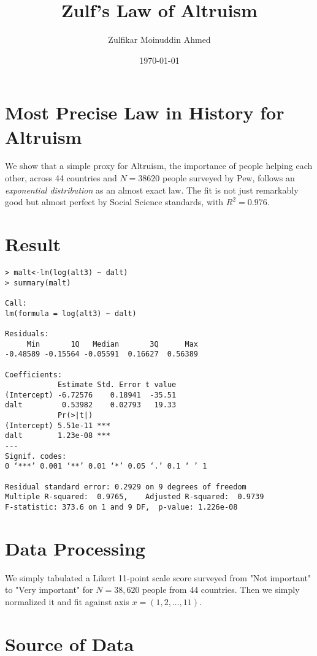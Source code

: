 \documentclass{amsart}
\title{Zulf's Law of Altruism}
\author{Zulfikar Moinuddin Ahmed}
\date{\today}
\begin{document}
\maketitle

\section{Most Precise Law in History for Altruism}

We show that a simple proxy for Altruism, the importance of people helping each other, across 44 countries and $N=38620$ people surveyed by Pew, follows an {\em exponential distribution} as an almost exact law.  The fit is not just remarkably good but almost perfect by Social Science standards, with $R^2 = 0.976$.

\section{Result}

\begin{verbatim}
> malt<-lm(log(alt3) ~ dalt)
> summary(malt)

Call:
lm(formula = log(alt3) ~ dalt)

Residuals:
     Min       1Q   Median       3Q      Max 
-0.48589 -0.15564 -0.05591  0.16627  0.56389 

Coefficients:
            Estimate Std. Error t value
(Intercept) -6.72576    0.18941  -35.51
dalt         0.53982    0.02793   19.33
            Pr(>|t|)    
(Intercept) 5.51e-11 ***
dalt        1.23e-08 ***
---
Signif. codes:  
0 ‘***’ 0.001 ‘**’ 0.01 ‘*’ 0.05 ‘.’ 0.1 ‘ ’ 1

Residual standard error: 0.2929 on 9 degrees of freedom
Multiple R-squared:  0.9765,	Adjusted R-squared:  0.9739 
F-statistic: 373.6 on 1 and 9 DF,  p-value: 1.226e-08
\end{verbatim}

\section{Data Processing}
We simply tabulated a Likert 11-point scale score surveyed from "Not important" to "Very important" for $N=38,620$ people from 44 countries.  Then we simply normalized it and fit against axis $x=(1,2,\dots,11)$.

\section{Source of Data}
\end{document}
